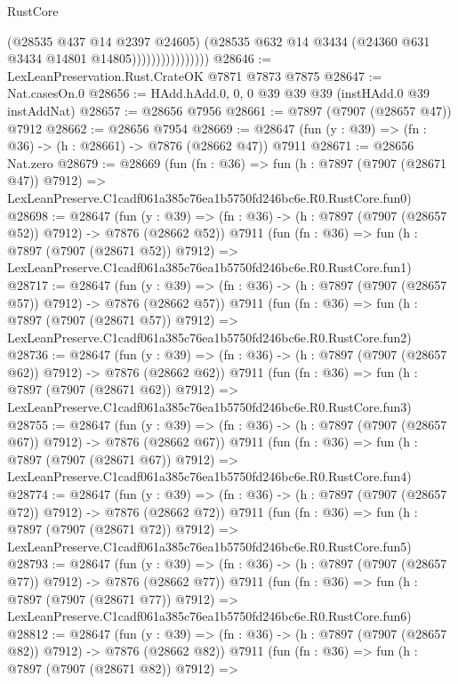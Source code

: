 \begin{lexlean}{RustCore}
\begin{coremodule}
                                (@28535 @437 @14 @2397 @24605)
                                (@28535
                                  @632
                                  @14
                                  @3434
                                  (@24360 @631 @3434 @14801 @14805))))))))))))))))
@28646 := LexLeanPreservation.Rust.CrateOK @7871 @7873 @7875
@28647 := Nat.casesOn.{0}
@28656 := HAdd.hAdd.{0, 0, 0} @39 @39 @39 (instHAdd.{0} @39 instAddNat)
@28657 := @28656 @7956
@28661 := @7897 (@7907 (@28657 @47)) @7912
@28662 := @28656 @7954
@28669 := @28647 (fun (y : @39) => (fn : @36) -> (h : @28661) -> @7876 (@28662 @47)) @7911
@28671 := @28656 Nat.zero
@28679 := @28669
    (fun (fn : @36) =>
    fun (h : @7897 (@7907 (@28671 @47)) @7912) =>
    LexLeanPreserve.C1cadf061a385c76ea1b5750fd246bc6e.R0.RustCore.fun0)
@28698 := @28647
    (fun (y : @39) => (fn : @36) -> (h : @7897 (@7907 (@28657 @52)) @7912) -> @7876 (@28662 @52))
    @7911
    (fun (fn : @36) =>
    fun (h : @7897 (@7907 (@28671 @52)) @7912) =>
    LexLeanPreserve.C1cadf061a385c76ea1b5750fd246bc6e.R0.RustCore.fun1)
@28717 := @28647
    (fun (y : @39) => (fn : @36) -> (h : @7897 (@7907 (@28657 @57)) @7912) -> @7876 (@28662 @57))
    @7911
    (fun (fn : @36) =>
    fun (h : @7897 (@7907 (@28671 @57)) @7912) =>
    LexLeanPreserve.C1cadf061a385c76ea1b5750fd246bc6e.R0.RustCore.fun2)
@28736 := @28647
    (fun (y : @39) => (fn : @36) -> (h : @7897 (@7907 (@28657 @62)) @7912) -> @7876 (@28662 @62))
    @7911
    (fun (fn : @36) =>
    fun (h : @7897 (@7907 (@28671 @62)) @7912) =>
    LexLeanPreserve.C1cadf061a385c76ea1b5750fd246bc6e.R0.RustCore.fun3)
@28755 := @28647
    (fun (y : @39) => (fn : @36) -> (h : @7897 (@7907 (@28657 @67)) @7912) -> @7876 (@28662 @67))
    @7911
    (fun (fn : @36) =>
    fun (h : @7897 (@7907 (@28671 @67)) @7912) =>
    LexLeanPreserve.C1cadf061a385c76ea1b5750fd246bc6e.R0.RustCore.fun4)
@28774 := @28647
    (fun (y : @39) => (fn : @36) -> (h : @7897 (@7907 (@28657 @72)) @7912) -> @7876 (@28662 @72))
    @7911
    (fun (fn : @36) =>
    fun (h : @7897 (@7907 (@28671 @72)) @7912) =>
    LexLeanPreserve.C1cadf061a385c76ea1b5750fd246bc6e.R0.RustCore.fun5)
@28793 := @28647
    (fun (y : @39) => (fn : @36) -> (h : @7897 (@7907 (@28657 @77)) @7912) -> @7876 (@28662 @77))
    @7911
    (fun (fn : @36) =>
    fun (h : @7897 (@7907 (@28671 @77)) @7912) =>
    LexLeanPreserve.C1cadf061a385c76ea1b5750fd246bc6e.R0.RustCore.fun6)
@28812 := @28647
    (fun (y : @39) => (fn : @36) -> (h : @7897 (@7907 (@28657 @82)) @7912) -> @7876 (@28662 @82))
    @7911
    (fun (fn : @36) =>
    fun (h : @7897 (@7907 (@28671 @82)) @7912) =>

\end{coremodule}
\end{lexlean}
